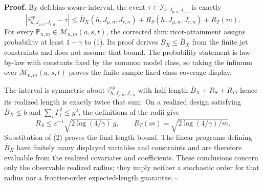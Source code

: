 \textbf{Proof.}
By \(\mathrm{def:bias\text{-}aware\text{-}interval}\), the event \(\tau\in\mathcal I_{h,J_{\mu,n},J_{r,n}}\) is exactly
\[
\left|\widehat\tau^{\mathrm{sp}}_{h,J_{\mu,n},J_{r,n}}-\tau\right|
\le \overline B_X(h,J_{\mu,n},J_{r,n})
+R_S(h,J_{\mu,n},J_{r,n})+R_T(m).
\tag{1}
\]
For every \(\mathbb P_{n,m}\in\mathcal M_{n,m}(a,s,t)\), the corrected \(\mathrm{thm:ricot\text{-}attainment}\) assigns probability at least \(1-\gamma\) to (1). Its proof derives \(B_X\le\overline B_X\) from the finite jet constraints and does not assume that bound. The probability statement is law-by-law with constants fixed by the common model class, so taking the infimum over \(\mathcal M_{n,m}(a,s,t)\) proves the finite-sample fixed-class coverage display.

The interval is symmetric about \(\widehat\tau^{\mathrm{sp}}_{h,J_{\mu,n},J_{r,n}}\) with half-length \(\overline B_X+R_S+R_T\); hence its realized length is exactly twice that sum. On a realized design satisfying \(\overline B_X\le b\) and \(\sum_i\Gamma_i^2\le g^2\), the definitions of the radii give
\[
R_S\le\varepsilon^{-1}\sqrt{2\log(4/\gamma)}\,g,
\qquad
R_T(m)=\sqrt{2\log(4/\gamma)/m}.
\tag{2}
\]
Substitution of (2) proves the final length bound. The linear programs defining \(\overline B_X\) have finitely many displayed variables and constraints and are therefore evaluable from the realized covariates and coefficients. These conclusions concern only the observable realized radius; they imply neither a stochastic order for that radius nor a frontier-order expected-length guarantee. \(\square\)